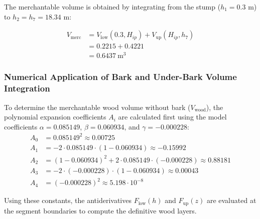 \documentclass[twocolumn, bibliography=totoc]{scrartcl}
\begin{document}
The merchantable volume is obtained by integrating from the stump ($h_1 = 0.3$ m) to $h_2 = h_7 = 18.34$ m:

\begin{equation}
\begin{aligned}
V_{\text{merc}} &= V_{\text{low}}(0.3, H_{ip}) + V_{\text{up}}(H_{ip}, h_7) \\
&= 0.2215 + 0.4221 \\
&= 0.6437\ \text{m}^3
\end{aligned}
\end{equation}

\subsubsection{Numerical Application of Bark and Under-Bark Volume Integration}

To determine the merchantable wood volume without bark ($V_{\text{wood}}$), the polynomial expansion coefficients $A_i$ are calculated first using the model coefficients $\alpha = 0.085149$, $\beta = 0.060934$, and $\gamma = -0.000228$:
\begin{align*}
    A_0 &= 0.085149^2 \approx 0.00725 \\
    A_1 &= -2 \cdot 0.085149 \cdot (1 - 0.060934) \approx -0.15992 \\
    A_2 &= (1 - 0.060934)^2 + 2 \cdot 0.085149 \cdot (-0.000228) \approx 0.88181 \\
    A_3 &= -2 \cdot (-0.000228) \cdot (1 - 0.060934) \approx 0.00043 \\
    A_4 &= (-0.000228)^2 \approx 5.198 \cdot 10^{-8}
\end{align*}

Using these constants, the antiderivatives $F_{\text{low}}(h)$ and $F_{\text{up}}(z)$ are evaluated at the segment boundaries to compute the definitive wood layers.
\end{document}
